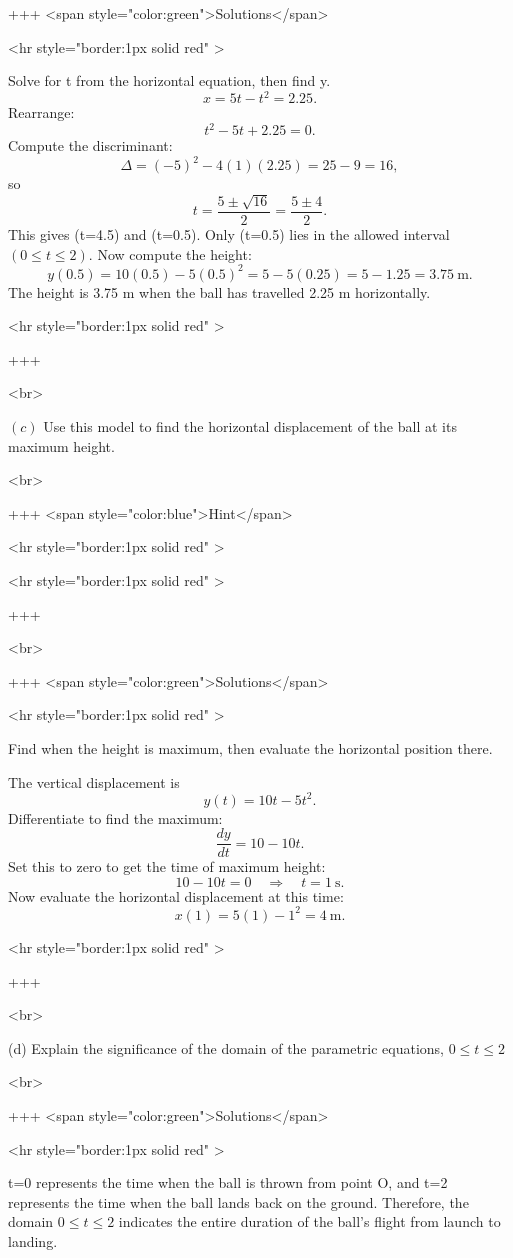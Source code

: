 +++ <span style="color:green">Solutions</span>

<hr style="border:1px solid red" >

Solve for t from the horizontal equation, then find y.
$$
x=5t-t^{2}=2.25.
$$
Rearrange:
$$
t^{2}-5t+2.25=0.
$$
Compute the discriminant:
$$
\Delta=(-5)^{2}-4(1)(2.25)=25-9=16,
$$
so
$$
t=\frac{5\pm\sqrt{16}}{2}=\frac{5\pm4}{2}.
$$
This gives (t=4.5) and (t=0.5). Only (t=0.5) lies in the allowed interval $(0\le t\le2)$.
Now compute the height:
$$
y(0.5)=10(0.5)-5(0.5)^{2}=5-5(0.25)=5-1.25=3.75\ \text{m}.
$$
The height is 3.75 m when the ball has travelled 2.25 m horizontally.

<hr style="border:1px solid red" >

+++

<br>


\((c)\) Use this model to find the horizontal displacement of the ball at its maximum height.

<br>

+++ <span style="color:blue">Hint</span>

<hr style="border:1px solid red" >

<hr style="border:1px solid red" >

+++

<br>

+++ <span style="color:green">Solutions</span>

<hr style="border:1px solid red" >

Find when the height is maximum, then evaluate the horizontal position there.

The vertical displacement is
$$
y(t)=10t-5t^{2}.
$$
Differentiate to find the maximum:
$$
\frac{dy}{dt}=10-10t.
$$
Set this to zero to get the time of maximum height:
$$
10-10t=0 \quad\Rightarrow\quad t=1\ \text{s}.
$$
Now evaluate the horizontal displacement at this time:
$$
x(1)=5(1)-1^{2}=4\ \text{m}.
$$

<hr style="border:1px solid red" >

+++

<br>

(d) Explain the significance of the domain of the parametric equations, $0 \leq t \leq 2$

<br>

+++ <span style="color:green">Solutions</span>

<hr style="border:1px solid red" >

t=0 represents the time when the ball is thrown from point O, and t=2 represents the time when the ball lands back on the ground. Therefore, the domain $0 \leq t \leq 2$ indicates the entire duration of the ball's flight from launch to landing.

